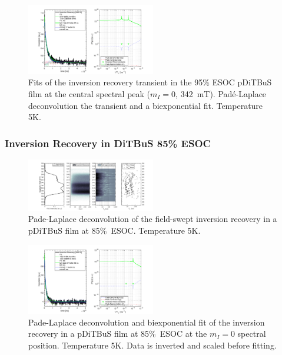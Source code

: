\begin{figure}[ht!]
\center
	\includegraphics[width=0.5\textwidth]{./pulse/figures/Figure_S17.pdf}
	\caption{Fits of the inversion recovery transient in the 95\% ESOC pDiTBuS film at the central spectral peak ($m_I=0$, 342~mT). Pad{\'e}-Laplace deconvolution the transient and a biexponential fit. Temperature 5K.}
	\label{fig:Figure_S17}
\end{figure}


\newpage
\subsubsection{Inversion Recovery in DiTBuS 85\% ESOC}
\begin{figure}[h]
\center
	\includegraphics[width=0.5\textwidth]{./pulse/figures/Figure_S18.pdf}
	\caption{Pade-Laplace deconvolution of the field-swept inversion recovery in a pDiTBuS film at 85\%~ESOC. Temperature 5K.}
	\label{fig:Figure_S18}
\end{figure}


\begin{figure}[ht!]
\center
	\includegraphics[width=0.5\textwidth]{./pulse/figures/Figure_S19.pdf}
	\caption{Pade-Laplace deconvolution and biexponential fit of the inversion recovery in a pDiTBuS film at 85\%~ESOC at the $m_I=0$ spectral position. Temperature 5K. Data is inverted and scaled before fitting.}
	\label{fig:Figure_S19}
\end{figure}



